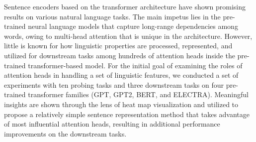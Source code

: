 Sentence encoders based on the transformer architecture have shown promising results on various natural language tasks. The main impetus lies in the pre-trained neural language models that capture long-range dependencies among words, owing to multi-head attention that is unique in the architecture. However, little is known for how linguistic properties are processed, represented, and utilized for downstream tasks among hundreds of attention heads inside the pre-trained transformer-based model. For the initial goal of examining the roles of attention heads in handling a set of linguistic features, we conducted a set of experiments with ten probing tasks and three downstream tasks on four pre-trained transformer families (GPT, GPT2, BERT, and ELECTRA). Meaningful insights are shown through the lens of heat map visualization and utilized to propose a relatively simple sentence representation method that takes advantage of most influential attention heads, resulting in additional performance improvements on the downstream tasks.
